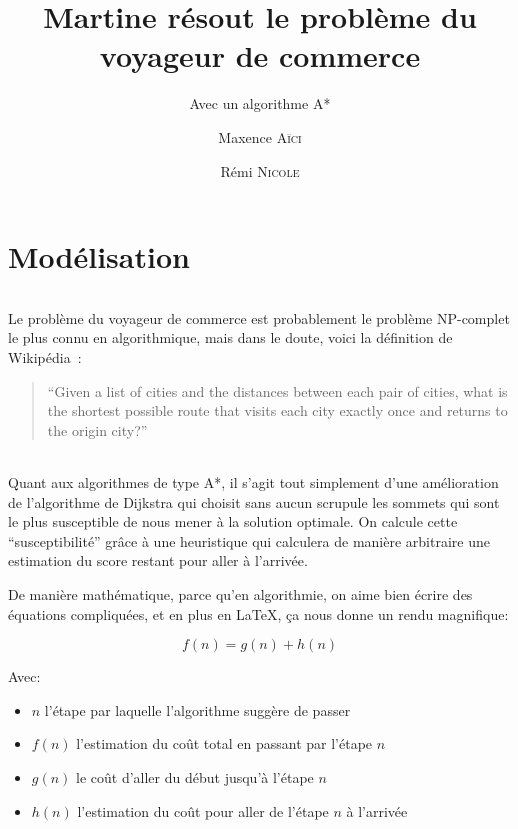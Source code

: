 \documentclass[french]{article}
\title{Martine résout le problème du voyageur de commerce}
\subtitle{Avec un algorithme A*}
\author{Maxence \textsc{Aïci} \and Rémi \textsc{Nicole}}
\begin{document}
\maketitle

\tableofcontents

\part{Modélisation}

\paragraph{} Le problème du voyageur de commerce est probablement le problème
NP-complet le plus connu en algorithmique, mais dans le doute, voici la
définition de Wikipédia~\cite{wiki:tsp}:

\begin{quote}
	``Given a list of cities and the distances between each
	pair of cities, what is the shortest possible route that visits each city
	exactly once and returns to the origin city?''
\end{quote}

\paragraph{} Quant aux algorithmes de type A*, il s'agit tout simplement d'une
amélioration de l'algorithme de Dijkstra qui choisit sans aucun scrupule les
sommets qui sont le plus susceptible de nous mener à la solution optimale. On
calcule cette ``susceptibilité'' grâce à une heuristique qui calculera de
manière arbitraire une estimation du score restant pour aller à l'arrivée.

De manière mathématique, parce qu'en algorithmie, on aime bien écrire des
équations compliquées, et en plus en \LaTeX, ça nous donne un rendu magnifique:

\[f(n) = g(n) + h(n)\]

Avec:
\begin{itemize}
	\item $n$ l'étape par laquelle l'algorithme suggère de passer
	\item $f(n)$ l'estimation du coût total en passant par l'étape $n$
	\item $g(n)$ le coût d'aller du début jusqu'à l'étape $n$
	\item $h(n)$ l'estimation du coût pour aller de l'étape $n$ à l'arrivée
\end{itemize}
\end{document}
